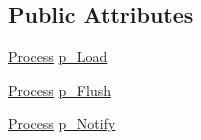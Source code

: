 \subsection*{Public Attributes}
\begin{DoxyCompactItemize}
\item 
\hyperlink{class_simulator_1_1_process}{Process} \hyperlink{class_simulator_1_1_active_r_o_m_a90f8af64b9221bdf569469b15e884074}{p\+\_\+\+Load}
\item 
\hyperlink{class_simulator_1_1_process}{Process} \hyperlink{class_simulator_1_1_active_r_o_m_a31128178f03df7605187c744a722d141}{p\+\_\+\+Flush}
\item 
\hyperlink{class_simulator_1_1_process}{Process} \hyperlink{class_simulator_1_1_active_r_o_m_ad0eb552ec1b8f04c49c8d4f2c12722ef}{p\+\_\+\+Notify}
\end{DoxyCompactItemize}


